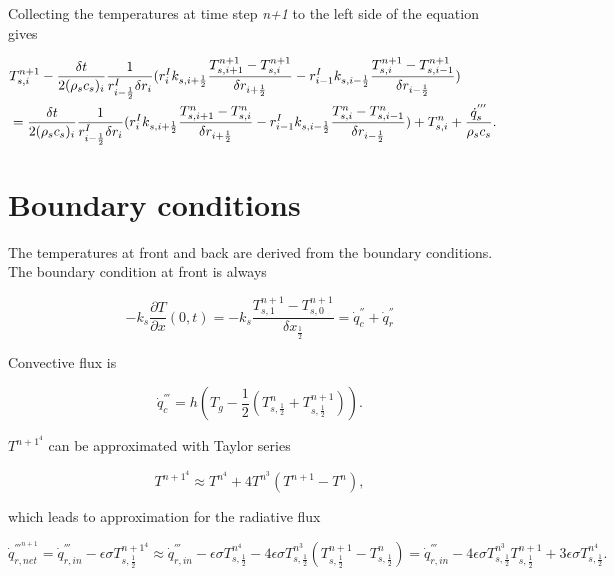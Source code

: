 Collecting the temperatures at time step \textit{n+1} to the left side of the equation gives

 \begin{eqnarray}
\label{crank-nicolson_2}
  \lefteqn{T_{s,i}^{n+1}-\frac{\delta t}{2(\rho_s c_s)_i}\frac{1}{r_{i-\frac{1}{2}}^I \delta r_i}(r_{i}^{I}k_{s,i+\frac{1}{2}}\frac{T_{s,i+1}^{n+1}-T_{s,i}^{n+1}}{\delta r_{i+\frac{1}{2}}}-r_{i-1}^{I}k_{s,i-\frac{1}{2}}\frac{T_{s,i}^{n+1}-T_{s,i-1}^{n+1}}{\delta r_{i-\frac{1}{2}}})}\nonumber\\
 & =\frac{\delta t}{2(\rho_s c_s)_i}\frac{1}{r_{i-\frac{1}{2}}^I \delta r_i}(r_{i}^{I}k_{s,i+\frac{1}{2}}\frac{T_{s,i+1}^{n}-T_{s,i}^{n}}{\delta r_{i+\frac{1}{2}}}-r_{i-1}^{I}k_{s,i-\frac{1}{2}}\frac{T_{s,i}^{n}-T_{s,i-1}^{n}}{\delta r_{i-\frac{1}{2}}})+T_{s,i}^{n}+\frac{\dot{q}^{'''}_s}{\rho_s c_s}.\nonumber\\
\end{eqnarray} 

\section{Boundary conditions}
The temperatures at front and back are derived from the boundary conditions. The boundary condition at front is always

\begin{equation}
\label{bc_front}
  -k_s \frac{\partial T}{\partial x} (0,t) 
  = -k_s \frac{T_{s,1}^{n+1}-T_{s,0}^{n+1}}{\delta x_{\frac{1}{2}}}
  =  \dot{q}_{c}^{''}+\dot{q}_{r}^{''}
\end{equation}

Convective flux is

\begin{equation}
\label{conv}
  \dot{q}_c^{'''} = h(T_g - \frac{1}{2}(T_{s,\frac{1}{2}}^n+T_{s,\frac{1}{2}}^{n+1})).
\end{equation}

$T^{n+1^{4}}$ can be approximated with Taylor series

\begin{equation}
\label{T_taylor}
  T^{n+1^4} \approx T^{n^4} + 4T^{n^3}(T^{n+1}-T^n),
\end{equation}

which leads to approximation for the radiative flux

\begin{equation}
\label{radi}
  \dot{q}_{r,net}^{'''^{n+1}} 
  = \dot{q}_{r, in}^{'''} - \epsilon\sigma T_{s,\frac{1}{2}}^{n+1^4} 
  \approx \dot{q}_{r, in}^{'''} - \epsilon\sigma T_{s,\frac{1}{2}}^{n^4} - 4\epsilon\sigma T_{s,\frac{1}{2}}^{n^3}(T_{s,\frac{1}{2}}^{n+1}-T_{s,\frac{1}{2}}^n) 
  = \dot{q}_{r, in}^{'''}-4\epsilon\sigma T_{s,\frac{1}{2}}^{n^3}T_{s,\frac{1}{2}}^{n+1} + 3\epsilon\sigma T_{s,\frac{1}{2}}^{n^4}.
\end{equation}

